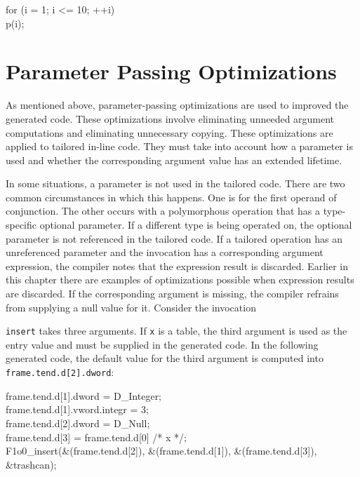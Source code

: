 \goodbreak
\begin{iconcode}
\>for (i = 1; i <= 10; ++i)\\
\>\>p(i);\\
\end{iconcode}


\section{Parameter Passing Optimizations}

As mentioned above, parameter-passing optimizations are used to
improved the generated code. These optimizations involve eliminating
unneeded argument computations and eliminating unnecessary
copying. These optimizations are applied to tailored in-line
code. They must take into account how a parameter is used and whether
the corresponding argument value has an extended lifetime.

In some situations, a parameter is not used in the tailored
code. There are two common circumstances in which this happens. One is
for the first operand of conjunction. The other occurs with a
polymorphous operation that has a type-specific optional parameter. If
a different type is being operated on, the optional parameter is not
referenced in the tailored code. If a tailored operation has an
unreferenced parameter and the invocation has a corresponding argument
expression, the compiler notes that the expression result is
discarded. Earlier in this chapter there are examples of optimizations
possible when expression results are discarded. If the corresponding
argument is missing, the compiler refrains from supplying a null value
for it. Consider the invocation


\noindent \texttt{insert} takes three arguments. If \texttt{x} is a
table, the third argument is used as the entry value and must be
supplied in the generated code. In the following generated code, the
default value for the third argument is computed into
\texttt{frame.tend.d[2].dword}:

\goodbreak
\begin{iconcode}
\>frame.tend.d[1].dword = D\_Integer;\\
\>frame.tend.d[1].vword.integr = 3;\\
\>frame.tend.d[2].dword = D\_Null;\\
\>frame.tend.d[3] = frame.tend.d[0] /* x */;\\
\>F1o0\_insert(\&(frame.tend.d[2]), \&(frame.tend.d[1]), \&(frame.tend.d[3]),\\
\>\>\&trashcan);\\
\end{iconcode}

